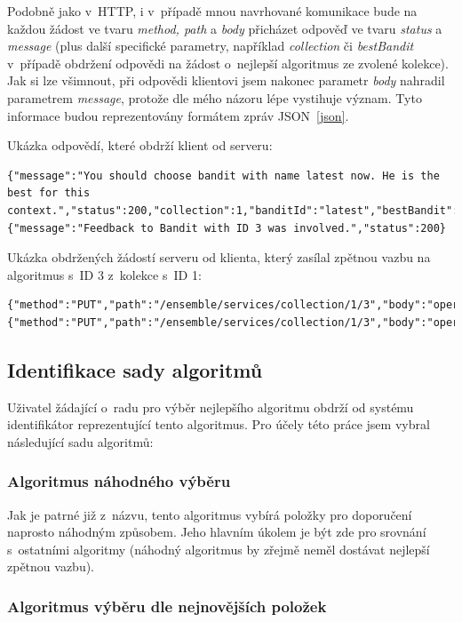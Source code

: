 \documentclass[thesis=M,czech]{FITthesis}[2014/05/07]
\begin{document}
Podobně jako v~HTTP, i v~případě mnou navrhované komunikace bude na každou žádost ve tvaru \emph{method, path} a \emph{body} přicházet odpověď ve tvaru \emph{status} a \emph{message} (plus další specifické parametry, například \emph{collection} či \emph{bestBandit} v~případě obdržení odpovědi na žádost o~nejlepší algoritmus ze zvolené kolekce). Jak si lze všimnout, při odpovědi klientovi jsem nakonec parametr \emph{body} nahradil parametrem \emph{message}, protože dle mého názoru lépe vystihuje význam. Tyto informace budou reprezentovány formátem zpráv JSON~\ref{json}.

Ukázka odpovědí, které obdrží klient od serveru:

\begin{lstlisting}
{"message":"You should choose bandit with name latest now. He is the best for this context.","status":200,"collection":1,"banditId":"latest","bestBandit":3}
{"message":"Feedback to Bandit with ID 3 was involved.","status":200}
\end{lstlisting}

Ukázka obdržených žádostí serveru od klienta, který zasílal zpětnou vazbu na algoritmus s~ID 3 z~kolekce s~ID 1:

\begin{lstlisting}
{"method":"PUT","path":"/ensemble/services/collection/1/3","body":"operation=use"}
{"method":"PUT","path":"/ensemble/services/collection/1/3","body":"operation=feedback&feedbackType=possitive"}
\end{lstlisting}
			
\subsection{Identifikace sady algoritmů}
Uživatel žádající o~radu pro výběr nejlepšího algoritmu obdrží od systému identifikátor reprezentující tento algoritmus. Pro účely této práce jsem vybral následující sadu algoritmů:

\subsubsection{Algoritmus náhodného výběru}

Jak je patrné již z~názvu, tento algoritmus vybírá položky pro doporučení naprosto náhodným způsobem. Jeho hlavním úkolem je být zde pro srovnání s~ostatními algoritmy (náhodný algoritmus by zřejmě neměl dostávat nejlepší zpětnou vazbu). 

\subsubsection{Algoritmus výběru dle nejnovějších položek}
\end{document}
